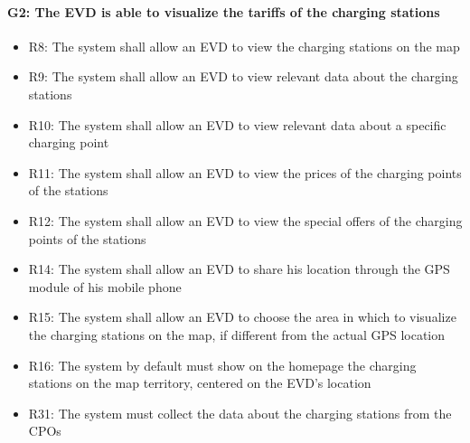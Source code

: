 \paragraph{G2: The EVD is able to visualize the tariffs of the charging stations}
\begin{itemize}
     \item R8: The system shall allow an EVD to view the charging stations on the map
    \item R9: The system shall allow an EVD to view relevant data about the charging stations
    \item R10: The system shall allow an EVD to view relevant data about a specific charging point
    \item R11: The system shall allow an EVD to view the prices of the charging points of the stations
    \item R12: The system shall allow an EVD to view the special offers of the charging points of the stations
    \item R14: The system shall allow an EVD to share his location through the GPS module of his mobile phone
    \item R15: The system shall allow an EVD to choose the area in which to visualize the charging stations on the map, if different from the actual GPS location
    \item R16: The system by default must show on the homepage the charging stations on the map territory, centered on the EVD's location
    \item R31: The system must collect the data about the charging stations from the CPOs
\end{itemize}
\clearpage
